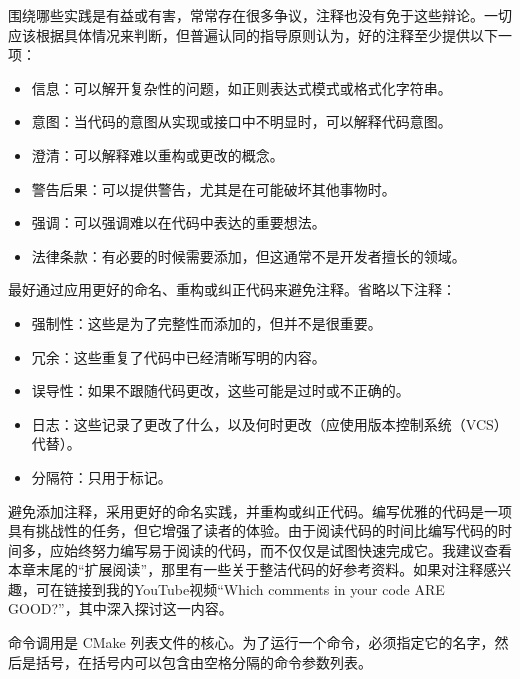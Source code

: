 围绕哪些实践是有益或有害，常常存在很多争议，注释也没有免于这些辩论。一切应该根据具体情况来判断，但普遍认同的指导原则认为，好的注释至少提供以下一项：

\begin{itemize}
\item
信息：可以解开复杂性的问题，如正则表达式模式或格式化字符串。

\item
意图：当代码的意图从实现或接口中不明显时，可以解释代码意图。

\item
澄清：可以解释难以重构或更改的概念。

\item
警告后果：可以提供警告，尤其是在可能破坏其他事物时。

\item
强调：可以强调难以在代码中表达的重要想法。

\item
法律条款：有必要的时候需要添加，但这通常不是开发者擅长的领域。
\end{itemize}

最好通过应用更好的命名、重构或纠正代码来避免注释。省略以下注释：

\begin{itemize}
\item
强制性：这些是为了完整性而添加的，但并不是很重要。

\item
冗余：这些重复了代码中已经清晰写明的内容。

\item
误导性：如果不跟随代码更改，这些可能是过时或不正确的。

\item
日志：这些记录了更改了什么，以及何时更改（应使用版本控制系统（VCS）代替）。

\item
分隔符：只用于标记。
\end{itemize}

避免添加注释，采用更好的命名实践，并重构或纠正代码。编写优雅的代码是一项具有挑战性的任务，但它增强了读者的体验。由于阅读代码的时间比编写代码的时间多，应始终努力编写易于阅读的代码，而不仅仅是试图快速完成它。我建议查看本章末尾的“扩展阅读”，那里有一些关于整洁代码的好参考资料。如果对注释感兴趣，可在链接到我的YouTube视频“Which comments in your code ARE GOOD?”，其中深入探讨这一内容。


命令调用是 CMake 列表文件的核心。为了运行一个命令，必须指定它的名字，然后是括号，在括号内可以包含由空格分隔的命令参数列表。

